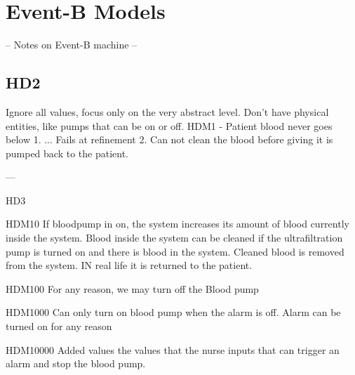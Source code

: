 \section{Event-B Models}
-- Notes on Event-B machine --

\subsection{HD2}
Ignore all values, focus only on the very abstract level. Don't have physical entities, like pumps that can be on or off.
HDM1 - Patient blood never goes below 1.
...
Fails at refinement 2. Can not clean the blood before giving it is pumped back to the patient.

---

HD3

HDM10
If bloodpump in on, the system increases its amount of blood currently inside the system.
Blood inside the system can be cleaned if the ultrafiltration pump is turned on and there is blood in the system.
Cleaned blood is removed from the system. IN real life it is returned to the patient. 

HDM100
For any reason, we may turn off the Blood pump

HDM1000
Can only turn on blood pump when the alarm is off.
Alarm can be turned on for any reason

HDM10000
Added values the values that the nurse inputs that can trigger an alarm and stop the blood pump.
